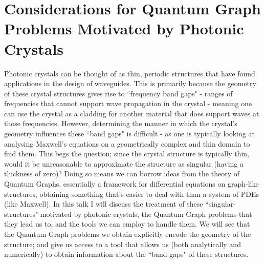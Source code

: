 \documentclass[11pt]{report}
\begin{document}
\chapter*{Considerations for Quantum Graph Problems Motivated by Photonic Crystals}

Photonic crystals can be thought of as thin, periodic structures that have found applications in the design of waveguides.
This is primarily because the geometry of these crystal structures gives rise to ``frequency band gaps" - ranges of frequencies that cannot support wave propagation in the crystal - meaning one can use the crystal as a cladding for another material that does support waves at those frequencies.
However, determining the manner in which the crystal's geometry influences these ``band gaps" is difficult - as one is typically looking at analysing Maxwell's equations on a geometrically complex and thin domain to find them.
This begs the question; since the crystal structure is typically thin, would it be unreasonable to approximate the structure as singular (having a thickness of zero)?
Doing so means we can borrow ideas from the theory of Quantum Graphs, essentially a framework for differential equations on graph-like structures, obtaining something that's easier to deal with than a system of PDEs (like Maxwell).
In this talk I will discuss the treatment of these ``singular-structures" motivated by photonic crystals, the Quantum Graph problems that they lead us to, and the tools we can employ to handle them.
We will see that the Quantum Graph problems we obtain explicitly encode the geometry of the structure; and give us access to a tool that allows us (both analytically and numerically) to obtain information about the ``band-gaps" of these structures.
\end{document}
